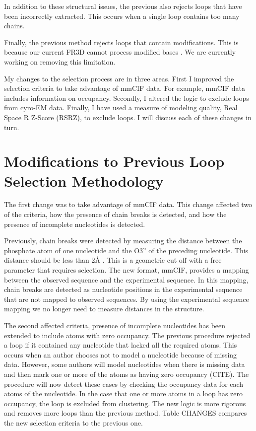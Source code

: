 In addition to these structural issues, the previous also rejects loops that
have been incorrectly extracted. This occurs when a single loop contains too
many chains.

Finally, the previous method rejects loops that contain modifications. This is
because our current FR3D cannot process modified bases \cite{Sarver2008a}. We are
currently working on removing this limitation.

My changes to the selection process are in three areas. First I improved the
selection criteria to take advantage of mmCIF data. For example, mmCIF data
includes information on occupancy. Secondly, I altered the logic to exclude
loops from cyro-EM data. Finally, I have used a measure of modeling quality,
Real Space R Z-Score (RSRZ), to exclude loops. I will discuss each of these
changes in turn.

\section{Modifications to Previous Loop Selection Methodology}

The first change was to take advantage of mmCIF data. This change affected two
of the criteria, how the presence of chain breaks is detected, and how the
presence of incomplete nucleotides is detected. 

Previously, chain breaks were detected by measuring the distance between the
phosphate atom of one nucleotide and the O3'' of the preceding nucleotide. This
distance should be less than 2{\AA} \cite{Petrov2012}. This is a geometric cut off
with a free parameter that requires selection. The new format, mmCIF, provides a
mapping between the observed sequence and the experimental sequence. In this
mapping, chain breaks are detected as nucleotide  positions in the experimental
sequence that are not mapped to observed sequences. By using the experimental
sequence mapping we no longer need to measure distances in the structure. 

The second affected criteria, presence of incomplete nucleotides has been
extended to include atoms with zero occupancy. The previous procedure rejected a
loop if it contained any nucleotide that lacked all the required atoms. This
occurs when an author chooses not to model a nucleotide because of missing data.
However, some authors will model nucleotides when there is missing data and then
mark one or more of the atoms as having zero occupancy (CITE). The procedure
will now detect these cases by checking the occupancy data for each atoms of the
nucleotide. In the case that one or more atoms in a loop has zero occupancy, the
loop is excluded from clustering. The new logic is more rigorous and removes
more loops than the previous method. Table CHANGES compares the new selection
criteria to the previous one.

